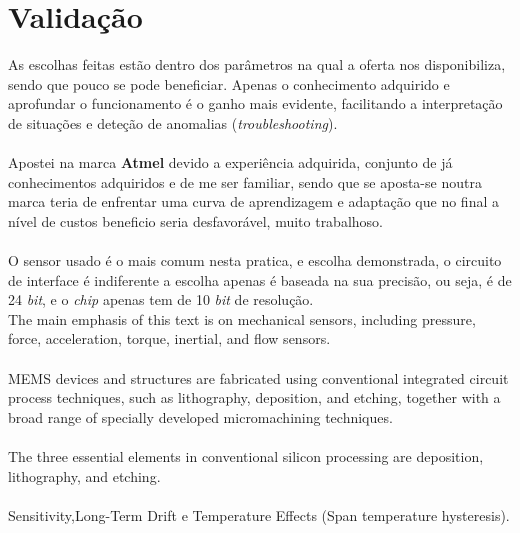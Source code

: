\section{Validação}
As escolhas feitas estão dentro dos parâmetros na qual a oferta nos disponibiliza, sendo que pouco se pode beneficiar. Apenas o conhecimento adquirido e aprofundar o funcionamento é o ganho mais evidente, facilitando a interpretação de situações e deteção de anomalias (\textit{troubleshooting}).\\
\\
Apostei na marca \textbf{Atmel} devido a experiência adquirida, conjunto de já conhecimentos adquiridos e de me ser familiar, sendo que se aposta-se noutra marca teria de enfrentar uma curva de aprendizagem e adaptação que no final a nível de custos beneficio seria desfavorável, muito trabalhoso.\\
\\
O sensor usado é o mais comum nesta pratica, e escolha demonstrada, o circuito de interface é indiferente a escolha apenas é baseada na sua precisão, ou seja, é de 24 \textit{bit}, e o \textit{chip} apenas tem  de 10 \textit{bit} de resolução.
\\

The main emphasis of this text is on mechanical sensors,
including pressure, force, acceleration, torque, inertial, and flow sensors. \cite{book-9}
\\
\\

MEMS devices and structures are fabricated using conventional integrated circuit
process techniques, such as lithography, deposition, and etching, together with a
broad range of specially developed micromachining techniques. \cite{book-9}
\\
\\
The three essential elements in conventional
silicon processing are deposition, lithography, and etching. \cite{book-9}
\\
\\
Sensitivity,Long-Term Drift e Temperature Effects (Span temperature hysteresis).

